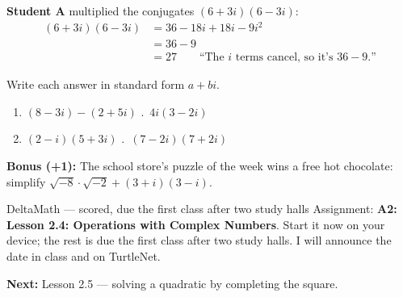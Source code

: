 \documentclass[aspectratio=169, 11pt]{beamer}
\begin{document}
\begin{frame}[t, plain]
  \textbf{Student A} multiplied the conjugates $(6+3i)(6-3i)$:
  \[
  \begin{aligned}
    (6+3i)(6-3i) &= 36-18i+18i-9i^2 \\
                 &= 36-9 \\
                 &= 27 \qquad \text{``The $i$ terms cancel, so it's $36-9$.''}
  \end{aligned}
  \]
\end{frame}

\begin{frame}[t, plain]
  Write each answer in standard form $a+bi$.
  \begin{enumerate}\setlength{\itemsep}{3pt}
    \item $(8-3i)-(2+5i)$ \qquad\qquad\qquad\quad{}.\ $4i(3-2i)$
    \setcounter{enumi}{2}
    \item $(2-i)(5+3i)$ \qquad\qquad\qquad\qquad\;.\ $(7-2i)(7+2i)$
  \end{enumerate}
  {\small\textbf{Bonus (+1):} The school store's puzzle of the week wins a free hot chocolate:
  simplify $\sqrt{-8}\cdot\sqrt{-2}+(3+i)(3-i)$.}
  \vspace{2pt}
\end{frame}

\begin{frame}[t, plain]
  \begin{block}{DeltaMath --- scored, due the first class after two study halls}
    Assignment: \textbf{A2: Lesson 2.4: Operations with Complex Numbers}. Start it now on your
    device; the rest is due the first class after two study halls. I will announce the date in
    class and on TurtleNet.
  \end{block}
  \vspace{6pt}
  \textbf{Next:} Lesson 2.5 --- solving a quadratic by completing the square.
\end{frame}
\end{document}
